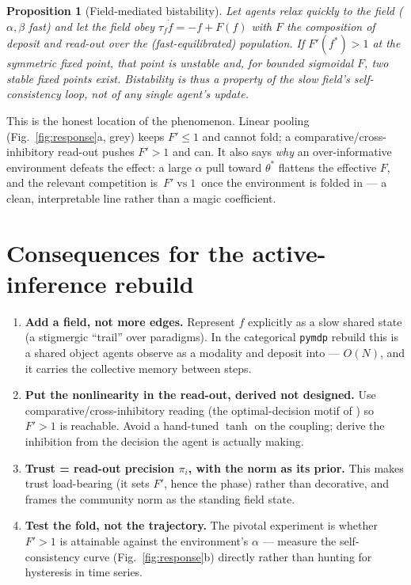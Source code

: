 \documentclass[11pt,a4paper]{article}
\theoremstyle{plain}
\newtheorem{proposition}{Proposition}
\begin{document}
\begin{proposition}[Field-mediated bistability]
Let agents relax quickly to the field ($\alpha,\beta$ fast) and let the field
obey $\tau_f\dot f = -f + F(f)$ with $F$ the composition of deposit and
read-out over the (fast-equilibrated) population. If $F'(f^\ast)>1$ at the
symmetric fixed point, that point is unstable and, for bounded sigmoidal
$F$, two stable fixed points exist. Bistability is thus a property of the
\emph{slow field's} self-consistency loop, not of any single agent's update.
\end{proposition}

\noindent This is the honest location of the phenomenon. Linear pooling
(Fig.~\ref{fig:response}a, grey) keeps $F'\le 1$ and cannot fold; a
comparative/cross-inhibitory read-out pushes $F'>1$ and can. It also says
\emph{why} an over-informative environment defeats the effect: a large
$\alpha$ pull toward $\theta^\ast$ flattens the effective $F$, and the
relevant competition is $\,F' \;\text{vs}\; 1\,$ once the environment is
folded in --- a clean, interpretable line rather than a magic coefficient.

\section{Consequences for the active-inference rebuild}
\label{sec:rebuild}

\begin{enumerate}
\item \textbf{Add a field, not more edges.} Represent $f$ explicitly as a
  slow shared state (a stigmergic ``trail'' over paradigms). In the
  categorical \texttt{pymdp} rebuild this is a shared object agents observe
  as a modality and deposit into --- $O(N)$, and it carries the collective
  memory between steps.
\item \textbf{Put the nonlinearity in the read-out, derived not designed.}
  Use comparative/cross-inhibitory reading (the optimal-decision motif of
  \cite{MarshallBogacz2009}) so $F'>1$ is reachable. Avoid a hand-tuned
  $\tanh$ on the coupling; derive the inhibition from the decision the agent
  is actually making.
\item \textbf{Trust = read-out precision $\pi_i$, with the norm as its prior.}
  This makes trust load-bearing (it sets $F'$, hence the phase) rather than
  decorative, and frames the community norm as the standing field state.
\item \textbf{Test the fold, not the trajectory.} The pivotal experiment is
  whether $F'>1$ is attainable against the environment's $\alpha$ ---
  measure the self-consistency curve (Fig.~\ref{fig:response}b) directly
  rather than hunting for hysteresis in time series.
\end{enumerate}
\end{document}
